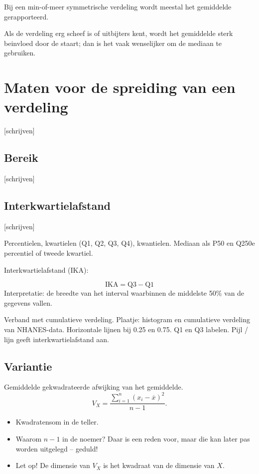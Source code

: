 \documentclass[
  a4paper,
]{scrbook}
\providecommand{\tightlist}{%
  \setlength{\itemsep}{0pt}\setlength{\parskip}{0pt}}\usepackage{longtable,booktabs,array}
\theoremstyle{definition}
\theoremstyle{definition}
\theoremstyle{remark}
\begin{document}
Bij een min-of-meer symmetrische verdeling wordt meestal het gemiddelde
gerapporteerd.

Als de verdeling erg scheef is of uitbijters kent, wordt het gemiddelde
sterk beinvloed door de staart; dan is het vaak wenselijker om de
mediaan te gebruiken.

\section{Maten voor de spreiding van een
verdeling}\label{maten-voor-de-spreiding-van-een-verdeling}

{[}schrijven{]}

\subsection{Bereik}\label{bereik}

{[}schrijven{]}

\subsection{Interkwartielafstand}\label{interkwartielafstand}

{[}schrijven{]}

Percentielen, kwartielen (Q1, Q2, Q3, Q4), kwantielen. Mediaan als P50
en Q250e percentiel of tweede kwartiel.

Interkwartielafstand (IKA):

\[ \mathrm{IKA} = \mathrm{Q3} - \mathrm{Q1}\] Interpretatie: de breedte
van het interval waarbinnen de middelste 50\% van de gegevens vallen.

Verband met cumulatieve verdeling. Plaatje: histogram en cumulatieve
verdeling van NHANES-data. Horizontale lijnen bij 0.25 en 0.75. Q1 en Q3
labelen. Pijl / lijn geeft interkwartielafstand aan.

\subsection{Variantie}\label{variantie}

Gemiddelde gekwadrateerde afwijking van het gemiddelde. \[
V_X = \frac{\sum_{i=1}^n \left(x_i - \overline{x}\right)^2}{n-1}.
\]

\begin{itemize}
\tightlist
\item
  Kwadratensom in de teller.
\item
  Waarom \(n - 1\) in de noemer? Daar is een reden voor, maar die kan
  later pas worden uitgelegd -- geduld!
\item
  Let op! De dimensie van \(V_X\) is het kwadraat van de dimensie van
  \(X\).
\end{itemize}
\end{document}
